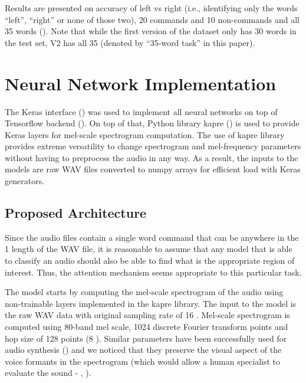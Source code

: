 \documentclass[authoryear, review, 12pt, 3p]{elsarticle}
\begin{document}
Results are presented on accuracy of left vs right (i.e., identifying only the words ``left'', ``right'' or none of those two), 20 commands and 10 non-commands and all 35 words (\cite{DBLP:journals/corr/abs-1710-08377}). Note that while the first version of the dataset only has 30 words in the test set, V2 has all 35 (denoted by  ``35-word task'' in this paper).









\section{Neural Network Implementation}
\label{secNNModels}

The Keras interface (\cite{chollet2015keras}) was used to implement all neural networks on top of Tensorflow backend (\cite{tensorflow2015-whitepaper}). On top of that, Python library kapre (\cite{choi2017kapre}) is used to provide Keras layers for mel-scale spectrogram computation. The use of kapre library provides extreme versatility to change spectrogram and mel-frequency parameters without having to preprocess the audio in any way. As a result, the inputs to the models are raw WAV files converted to numpy arrays for efficient load with Keras generators.





\subsection{Proposed Architecture}
\label{secPropArchit}

Since the audio files contain a single word command that can be anywhere in the 1 length of the WAV file, it is reasonable to assume that any model that is able to classify an audio should also be able to find what is the appropriate region of interest. Thus, the attention mechanism seems appropriate to this particular task.

The model starts by computing the mel-scale spectrogram of the audio using non-trainable layers implemented in the kapre library. The input to the model is the raw WAV data with original sampling rate of 16 . Mel-scale spectrogram is computed using 80-band mel scale, 1024 discrete Fourier transform points and hop size of 128 points (8 ). Similar parameters have been successfully used for audio synthesis (\cite{DBLP:journals/corr/WangSSWWJYXCBLA17}) and we noticed that they preserve the visual aspect of the voice formants in the spectrogram (which would allow a human specialist to evaluate the sound - \cite{Sundberg2013278}, \cite{Sundberg2015418}).
\end{document}
